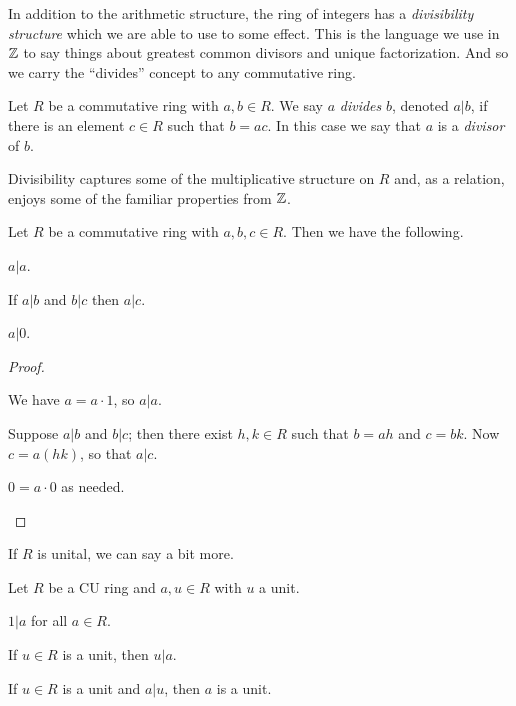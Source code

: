 In addition to the arithmetic structure, the ring of integers has a \emph{divisibility structure} which we are able to use to some effect.
This is the language we use in \(\mathbb{Z}\) to say things about greatest common divisors and unique factorization.
And so we carry the ``divides'' concept to any commutative ring.

\begin{dfn}[Divides] \label{dfn:divides}
Let \(R\) be a commutative ring with \(a,b \in R\).
We say \(a\) \emph{divides} \(b\), denoted \(a|b\), if there is an element \(c \in R\) such that \(b = ac\).
In this case we say that \(a\) is a \emph{divisor} of \(b\).
\end{dfn}

Divisibility captures some of the multiplicative structure on \(R\) and, as a relation, enjoys some of the familiar properties from \(\mathbb{Z}\).

\begin{prop} \label{prop:divides-basics}
Let \(R\) be a commutative ring with \(a,b,c \in R\).
Then we have the following.
\begin{proplist*}
\item \label{prop:divides-basics:refl} \(a|a\).
\item \label{prop:divides-basics:trans} If \(a|b\) and \(b|c\) then \(a|c\).
\item \label{prop:divides-basics:zero} \(a|0\).
\end{proplist*}
\end{prop}

\begin{proof}
\begin{inlineproplist}
\item We have \(a = a \cdot 1\), so \(a|a\).
\item Suppose \(a|b\) and \(b|c\); then there exist \(h,k \in R\) such that \(b = ah\) and \(c = bk\).
Now \(c = a(hk)\), so that \(a|c\).
\item \(0 = a \cdot 0\) as needed.
\end{inlineproplist}
\end{proof}

If \(R\) is unital, we can say a bit more.

\begin{prop} \label{prop:divides-u-basics}
Let \(R\) be a CU ring and \(a,u \in R\) with \(u\) a unit.
\begin{proplist*}
\item \label{prop:divides-u-basics:one} \(1|a\) for all \(a \in R\).
\item \label{prop:divides-u-basics:unit} If \(u \in R\) is a unit, then \(u|a\).
\item \label{prop:divides-u-basics:unit-div} If \(u \in R\) is a unit and \(a|u\), then \(a\) is a unit.
\end{proplist*}
\end{prop}

